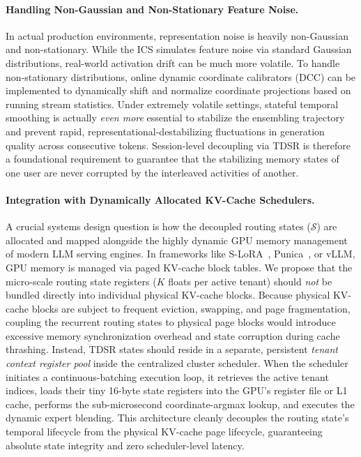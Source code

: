 \paragraph{Handling Non-Gaussian and Non-Stationary Feature Noise.}
In actual production environments, representation noise is heavily non-Gaussian and non-stationary. While the ICS simulates feature noise via standard Gaussian distributions, real-world activation drift can be much more volatile. To handle non-stationary distributions, online dynamic coordinate calibrators (DCC) can be implemented to dynamically shift and normalize coordinate projections based on running stream statistics. Under extremely volatile settings, stateful temporal smoothing is actually \emph{even more} essential to stabilize the ensembling trajectory and prevent rapid, representational-destabilizing fluctuations in generation quality across consecutive tokens. Session-level decoupling via TDSR is therefore a foundational requirement to guarantee that the stabilizing memory states of one user are never corrupted by the interleaved activities of another.

\paragraph{Integration with Dynamically Allocated KV-Cache Schedulers.}
A crucial systems design question is how the decoupled routing states ($\mathcal{S}$) are allocated and mapped alongside the highly dynamic GPU memory management of modern LLM serving engines. In frameworks like S-LoRA~\cite{s-lora}, Punica~\cite{chen2023punica}, or vLLM, GPU memory is managed via paged KV-cache block tables. We propose that the micro-scale routing state registers ($K$ floats per active tenant) should \emph{not} be bundled directly into individual physical KV-cache blocks. Because physical KV-cache blocks are subject to frequent eviction, swapping, and page fragmentation, coupling the recurrent routing states to physical page blocks would introduce excessive memory synchronization overhead and state corruption during cache thrashing. Instead, TDSR states should reside in a separate, persistent \emph{tenant context register pool} inside the centralized cluster scheduler. When the scheduler initiates a continuous-batching execution loop, it retrieves the active tenant indices, loads their tiny 16-byte state registers into the GPU's register file or L1 cache, performs the sub-microsecond coordinate-argmax lookup, and executes the dynamic expert blending. This architecture cleanly decouples the routing state's temporal lifecycle from the physical KV-cache page lifecycle, guaranteeing absolute state integrity and zero scheduler-level latency.